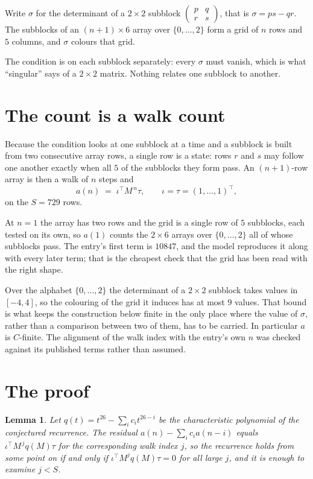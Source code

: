\documentclass[11pt,a4paper]{article}
\theoremstyle{plain}
\newtheorem{lemma}[theorem]{Lemma}
\theoremstyle{definition}
\begin{document}
Write $\sigma$ for the determinant of a $2\times2$ subblock
$\begin{pmatrix}p&q\\r&s\end{pmatrix}$, that is $\sigma=ps-qr$. The subblocks of an
$(n+1)\times6$ array over $\{0,\dots,2\}$ form a grid of $n$ rows and $5$
columns, and $\sigma$ colours that grid.

The condition is on each subblock separately: every $\sigma$ must vanish, which is what
``singular'' says of a $2\times2$ matrix. Nothing
relates one subblock to another.

\section{The count is a walk count}

Because the condition looks at one subblock at a time and a subblock is
built from two consecutive array rows, a single row is a state: rows $r$ and $s$ may follow one
another exactly when all $5$ of the subblocks they form pass. An $(n+1)$-row array is then a
walk of $n$ steps and
\[
a(n)\;=\;\iota^{\!\top}M^{\,n}\tau,\qquad\iota=\tau=(1,\dots,1)^{\!\top},
\]
on the $S=729$ rows.

At $n=1$ the array has two rows and the grid is a single row of $5$
subblocks, each tested on its own, so $a(1)$ counts the
$2\times6$ arrays over $\{0,\dots,2\}$ all of whose subblocks pass. The entry's
first term is $10847$, and the model reproduces it along with every later term; that is the
cheapest check that the grid has been read with the right shape.

Over the alphabet $\{0,\dots,2\}$ the determinant of a $2\times2$ subblock takes values in
$[-4,4]$, so the colouring of the grid it induces has at most $9$ values.
That bound is what keeps the construction below finite in the only place where the value of
$\sigma$, rather than a comparison between two of them, has to be carried.
In particular $a$ is $C$-finite. The alignment of the walk index with the entry's own $n$ was
checked against its published terms rather than assumed.

\section{The proof}

\begin{lemma}\label{lem:crit}
Let $q(t)=t^{26}-\sum_i c_it^{26-i}$ be the characteristic polynomial of the
conjectured recurrence. The residual $a(n)-\sum_ic_ia(n-i)$ equals
$\iota^{\!\top}M^{\,j}q(M)\tau$ for the corresponding walk index $j$, so the recurrence
holds from some point on if and only if $\iota^{\!\top}M^{j}q(M)\tau=0$ for all large $j$,
and it is enough to examine $j<S$.
\end{lemma}
\end{document}
